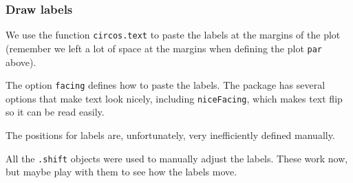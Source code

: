 \documentclass[
]{article}
\begin{document}
\hypertarget{draw-labels}{%
\subsubsection{Draw labels}\label{draw-labels}}

We use the function \texttt{circos.text} to paste the labels at the
margins of the plot (remember we left a lot of space at the margins when
defining the plot \texttt{par} above).

The option \texttt{facing} defines how to paste the labels. The package
has several options that make text look nicely, including
\texttt{niceFacing}, which makes text flip so it can be read easily.

The positions for labels are, unfortunately, very inefficiently defined
manually.

All the \texttt{.shift} objects were used to manually adjust the labels.
These work now, but maybe play with them to see how the labels move.
\end{document}
